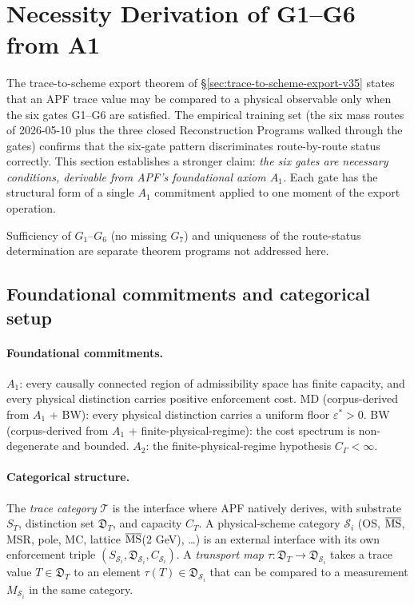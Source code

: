 \section{Necessity Derivation of G1--G6 from A1}
\label{sec:g1-g6-necessity-derivation}

The trace-to-scheme export theorem of \S\ref{sec:trace-to-scheme-export-v35} states that an APF trace value may be compared to a physical observable only when the six gates G1--G6 are satisfied. The empirical training set (the six mass routes of 2026-05-10 plus the three closed Reconstruction Programs walked through the gates) confirms that the six-gate pattern discriminates route-by-route status correctly. This section establishes a stronger claim: \emph{the six gates are necessary conditions, derivable from APF's foundational axiom $A_1$.} Each gate has the structural form of a single $A_1$ commitment applied to one moment of the export operation.

Sufficiency of $G_1$--$G_6$ (no missing $G_7$) and uniqueness of the route-status determination are separate theorem programs not addressed here.

\subsection{Foundational commitments and categorical setup}
\label{subsec:setup}

\paragraph{Foundational commitments.} $A_1$: every causally connected region of admissibility space has finite capacity, and every physical distinction carries positive enforcement cost. MD (corpus-derived from $A_1$ + BW): every physical distinction carries a uniform floor $\varepsilon^{*} > 0$. BW (corpus-derived from $A_1$ + finite-physical-regime): the cost spectrum is non-degenerate and bounded. $A_2$: the finite-physical-regime hypothesis $C_\Gamma < \infty$.

\paragraph{Categorical structure.} The \emph{trace category} $\mathcal{T}$ is the interface where APF natively derives, with substrate $S_T$, distinction set $\mathfrak{D}_T$, and capacity $C_T$. A physical-scheme category $\mathcal{S}_i$ (OS, $\overline{\rm MS}$, MSR, pole, MC, lattice $\overline{\rm MS}$(2 GeV), \dots) is an external interface with its own enforcement triple $(S_{\mathcal{S}_i}, \mathfrak{D}_{\mathcal{S}_i}, C_{\mathcal{S}_i})$. A \emph{transport map} $\tau: \mathfrak{D}_T \to \mathfrak{D}_{\mathcal{S}_i}$ takes a trace value $T \in \mathfrak{D}_T$ to an element $\tau(T) \in \mathfrak{D}_{\mathcal{S}_i}$ that can be compared to a measurement $M_{\mathcal{S}_i}$ in the same category.

